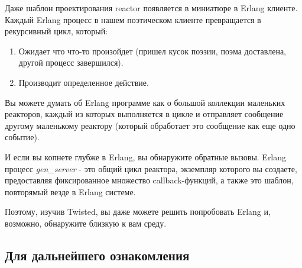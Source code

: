 Даже шаблон проектирования reactor появляется в миниатюре в Erlang клиенте. 
Каждый Erlang процесс в нашем поэтическом клиенте превращается в 
рекурсивный цикл, который:

\begin{enumerate}

\item Ожидает что что-то произойдет (пришел кусок поэзии, поэма доставлена, 
другой процесс завершился).

\item Производит определенное действие.

\end{enumerate}


Вы можете думать об Erlang программе как о большой коллекции маленьких 
реакторов, каждый из которых выполняется в цикле и отправляет сообщение 
другому маленькому реактору (который обработает это сообщение как еще одно событие).


И если вы копнете глубже в Erlang, вы обнаружите 
обратные вызовы. Erlang процесс \textit{gen\_server} - это 
общий цикл реактора, экземпляр которого вы создаете, 
предоставляя фиксированное множество callback-функций, а также это 
шаблон, повторямый везде в Erlang системе.

Поэтому, изучив Twisted, вы даже можете решить попробовать Erlang и, 
возможно, обнаружите близкую к вам среду. 
 

\subsection{Для дальнейшего ознакомления}

